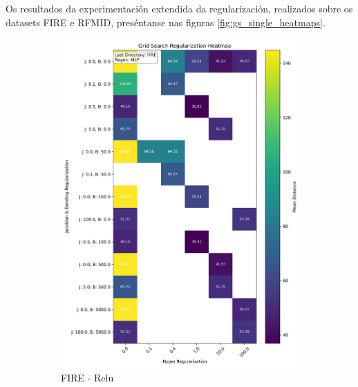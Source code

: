 Os resultados da experimentación extendida da regularización, realizados sobre os datasets FIRE e RFMID, preséntanse nas figuras \ref{fig:gs_single_heatmaps}.

\begin{figure}[ht]
    \centering
    \begin{subfigure}[b]{0.4\textwidth}
        \centering
        \includegraphics[width=\textwidth]{imaxes/grid_search_single_heatmap_FIRE_MLP.png}
        \caption{FIRE - Relu}
        \label{fig:gs_single_FIRE_MLP}
    \end{subfigure}\hfill
    \begin{subfigure}[b]{0.4\textwidth}
        \centering

\end{subfigure}
\end{figure}
